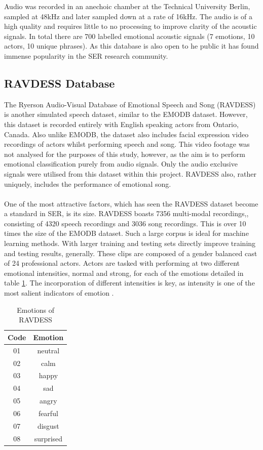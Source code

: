 Audio was recorded in an anechoic chamber at the Technical University Berlin, sampled at 48kHz and later sampled down at a rate of 16kHz. The audio is of a high quality and requires little to no processing to improve clarity of the acoustic signals. In total there are 700 labelled emotional acoustic signals (7 emotions, 10 actors, 10 unique phrases). As this database is also open to he public it has found immense popularity in the SER research community. 


\subsection{RAVDESS Database}
The Ryerson Audio-Visual Database of Emotional Speech and Song (RAVDESS) is another simulated speech dataset, similar to the EMODB dataset. However, this dataset is recorded entirely with English speaking actors from Ontario, Canada. Also unlike EMODB, the dataset also includes facial expression video recordings of actors whilst performing speech and song. This video footage was not analysed for the purposes of this study, however, as the aim is to perform emotional classification purely from audio signals. Only the audio exclusive signals were utilised from this dataset within this project. RAVDESS also, rather uniquely, includes the performance of emotional song. \\ \\
One of the most attractive factors, which has seen the RAVDESS dataset become a standard in SER, is its size. RAVDESS boasts 7356 multi-modal recordings,, consisting of 4320 speech recordings and 3036 song recordings. This is over 10 times the size of the EMODB dataset. Such a large corpus is ideal for machine learning methods. With larger training and testing sets directly improve training and testing results, generally. These clips are composed of a gender balanced cast of 24 professional actors. Actors are tasked with performing at two different emotional intensities, normal and strong, for each of the emotions detailed in table \ref{rav_emo_table}. The incorporation of different intensities is key, as intensity is one of the most salient indicators of emotion \cite{sonnemans1994structure}. 
\begin{table}[]
    \centering
    \begin{tabular}{|c|c|}
    \hline
    Code & Emotion \\ \hline \hline
    01 & neutral \\ \hline
    02 & calm \\ \hline
    03 & happy \\ \hline
    04 & sad \\ \hline
    05 & angry \\ \hline
    06 & fearful \\ \hline
    07 & disgust \\ \hline
    08 & surprised \\ \hline
    \end{tabular}
    \caption{Emotions of RAVDESS \cite{ravdess_dataset_2018}}
    \label{rav_emo_table}
\end{table}
